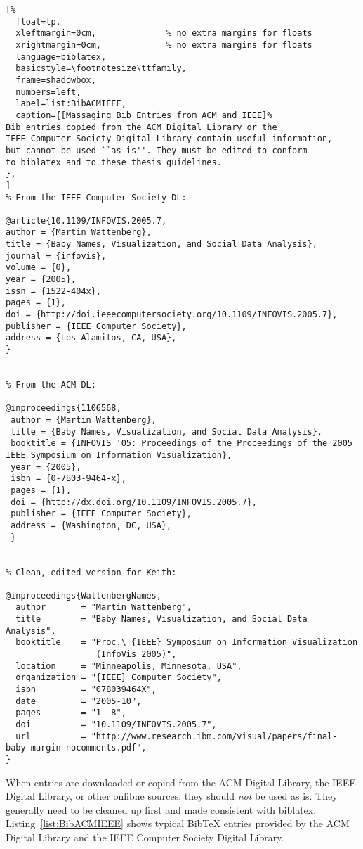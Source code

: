 \begin{lstlisting}[%
  float=tp,
  xleftmargin=0cm,              % no extra margins for floats
  xrightmargin=0cm,             % no extra margins for floats
  language=biblatex,
  basicstyle=\footnotesize\ttfamily,
  frame=shadowbox,
  numbers=left,
  label=list:BibACMIEEE,
  caption={[Massaging Bib Entries from ACM and IEEE]%
Bib entries copied from the ACM Digital Library or the
IEEE Computer Society Digital Library contain useful information,
but cannot be used ``as-is''. They must be edited to conform
to biblatex and to these thesis guidelines.
},
]
% From the IEEE Computer Society DL:

@article{10.1109/INFOVIS.2005.7,
author = {Martin Wattenberg},
title = {Baby Names, Visualization, and Social Data Analysis},
journal = {infovis},
volume = {0},
year = {2005},
issn = {1522-404x},
pages = {1},
doi = {http://doi.ieeecomputersociety.org/10.1109/INFOVIS.2005.7},
publisher = {IEEE Computer Society},
address = {Los Alamitos, CA, USA},
}


% From the ACM DL:

@inproceedings{1106568,
 author = {Martin Wattenberg},
 title = {Baby Names, Visualization, and Social Data Analysis},
 booktitle = {INFOVIS '05: Proceedings of the Proceedings of the 2005 IEEE Symposium on Information Visualization},
 year = {2005},
 isbn = {0-7803-9464-x},
 pages = {1},
 doi = {http://dx.doi.org/10.1109/INFOVIS.2005.7},
 publisher = {IEEE Computer Society},
 address = {Washington, DC, USA},
 }


% Clean, edited version for Keith:

@inproceedings{WattenbergNames,
  author       = "Martin Wattenberg",
  title        = "Baby Names, Visualization, and Social Data Analysis",
  booktitle    = "Proc.\ {IEEE} Symposium on Information Visualization
                  (InfoVis 2005)",
  location     = "Minneapolis, Minnesota, USA",
  organization = "{IEEE} Computer Society",
  isbn         = "078039464X",
  date         = "2005-10",
  pages        = "1--8",
  doi          = "10.1109/INFOVIS.2005.7",
  url          = "http://www.research.ibm.com/visual/papers/final-baby-margin-nocomments.pdf",
}
\end{lstlisting}



When  entries are downloaded or copied from the ACM
Digital Library, the IEEE Digital Library, or other onlibne sources,
they should \emph{not} be used as is. They generally need to be
cleaned up first and made consistent with biblatex.
Listing~\ref{list:BibACMIEEE} shows typical BibTeX entries provided by
the ACM Digital Library and the IEEE Computer Society Digital Library.


